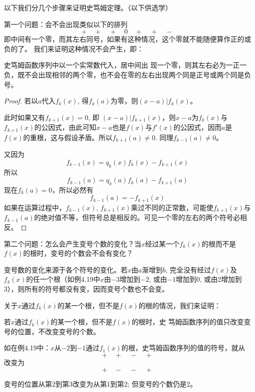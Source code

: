 以下我们分几个步骤来证明史笃姆定理。（以下供选学）

第一个问题：会不会出现类似以下的排列
\[+\quad +\quad +\quad 0\quad +\quad +\quad -\]
即中间有一个零，而其左右同号，如果有这种情况，这个零就不能随便算作正的或负的了。
我们来证明这种情况不会产生，即：
\begin{blk}{}
   史笃姆函数序列中以一个实常数代入，居中间出
现一个零，则其左右必为一正一负，既不会出现相邻的两个零，也不会在零的左右出现两个同是正号或两个同是负号。 
\end{blk}


\begin{proof}
若以$a$代入$f_k(x)$, 得$f_k(a)$为零，则$(x-a) |f_k (x)$。

此时如果又有$f_{k+1}(x)=0$, 即 $(x-a) |f_{k+1} (x)$，则$x-a$为$f_k(x)$与$f_{k+1}(x)$的公因式，由此可知$x-a$也是$f(x)$与$f'(x)$的公因式，因而$a$是$f(x)$的重根，这与假设矛盾。所以$f_{k+1}(a)\ne 0$. 同理$f_{k-1}(a)\ne 0$。

又因为$$f_{k-1}(x)=q_k(x)f_k(x)-f_{k+1}(x)$$所以$$f_{k-1}(a)=q_k(a)f_k(a)-f_{k+1}(a)$$
现在$f_k(a)=0$，所以必然有$$f_{k-1}(a)=-f_{k+1}(x)$$
如果在运算过程中，$f_{k-1}(x)$, $f_{k+1}(x)$乘过不同的正常数，可能使$f_{k+1}(x)$与$f_{k-1}(a)$的绝对值不等，但符号总是相反的。可见一个零的左右的两个符号必相反。
\end{proof}

第二个问题：怎么会产生变号个数的变化？当$x$经过某一个$f_k(x)$的根而不是$f(x)$的根时，变号的个数会不会有变化？

变号数的变化来源于各个符号的变化。若$x$由$a$渐增到$b$, 完全没有经过$f(x)$及$f_k(x)$的任一个根（如例4.19中$x$由$-3$增加到$-2$, 或由$-1$增加到0, 或由2增加到3），则所有的符号都没有变，因而变号个数也不会变。

关于$x$通过$f_k(x)$的某一个根，但不是$f(x)$的根的情况，我们来证明：
\begin{blk}{}
    若$x$通过$f_k(x)$的某一个根，但不是$f(x)$的根时，史
笃姆函数序列的值只改变变号的位置，不改变变号的个数。
\end{blk}

如在例4.19中：$x$从$-2$到$-1$通过$f_1(x)$的根，史笃姆函数序列的值的符号，就从
\[+\quad +\quad -\quad +\]
改变为
\[+\quad -\quad -\quad +\]

变号的位置从第2到第3改变为从第1到第2; 但变号的个数仍是2。

